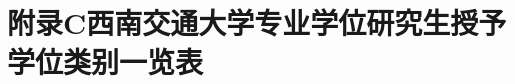 
\chapter*{附录C\quad 西南交通大学专业学位研究生授予学位类别一览表}\label{附录C}	
\setcounter{equation}{0}
\setcounter{figure}{0}
\setcounter{table}{0} 
\renewcommand{\theequation}{C-\arabic{equation}}
\renewcommand{\thefigure}{C-\arabic{figure}}
\renewcommand{\thetable}{C-\arabic{table}}




